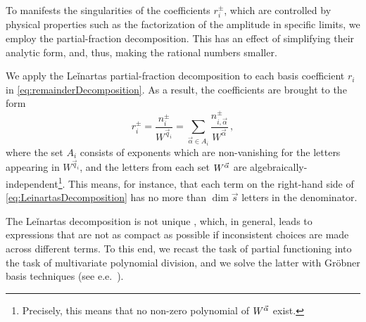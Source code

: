 To manifests the singularities
of the coefficients $r_i^\pm$, which are controlled by physical properties such
as the factorization of the amplitude in specific limits,
we employ the partial-fraction decomposition. 
This has an effect of simplifying their analytic form,
and, thus, making the rational numbers smaller.

We apply the Leǐnartas partial-fraction decomposition \cite{leinartas1978factorization,raichev2012leinartas,Smirnov:2005ky}
to each basis coefficient $r_i$ in \cref{eq:remainderDecomposition}.
As a result, the coefficients are brought to the form
\begin{equation}
    r_i^{\pm} = \frac{n_i^\pm }{W^{\vec q_i} } = \sum_{\vec\alpha \in A_{i}} \frac{n^{\pm}_{i,\vec\alpha}}{ W^{\vec\alpha} }\,,
    \label{eq:LeinartasDecomposition}
\end{equation}
where the set $A_{i}$ consists of exponents which are non-vanishing for the letters appearing 
in $W^{\vec q_i}$, and the letters from each set $W^{\va{\alpha}}$ are algebraically-independent\footnote{
 Precisely, this means that no non-zero polynomial of $W^{\va{\alpha}}$ exist.
}. 
This means, for instance, that each term on the right-hand side of \cref{eq:LeinartasDecomposition} 
has no more than $\dim{\vec s}$ letters in the denominator.

The Leǐnartas decomposition is not unique \cite{raichev2012leinartas},
which, in general, leads to expressions that are not as compact as possible if inconsistent choices
are made across different terms.
To this end, we recast the task of partial functioning into the task of multivariate polynomial division,
and we solve the latter with Gröbner basis techniques (see e.e.\ \cite{cox2013ideals}).

